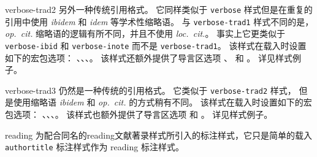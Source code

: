 \begin{marglist}
\item[verbose-trad2]
另外一种传统引用格式。
它同样类似于 \texttt{verbose} 样式但是在重复的引用中使用 \emph{ibidem} 和 \emph{idem} 等学术性缩略语。
与 \texttt{verbose-trad1} 样式不同的是，
\emph{op.~cit.} 缩略语的逻辑有所不同，并且不使用 \emph{loc.~cit.}。
事实上它更类似于 \texttt{verbose-ibid} 和 \texttt{verbose-inote} 而不是 \texttt{verbose-trad1}。
该样式在载入时设置如下的宏包选项：
、、、。
该样式还额外提供了导言区选项 、 和 。
详见样式例子。

\item[verbose-trad3]
仍然是一种传统的引用格式。
它类似于 \texttt{verbose-trad2} 样式，
但是使用缩略语 \emph{ibidem} 和 \emph{op.~cit.} 的方式稍有不同。
该样式在载入时设置如下的宏包选项：
、、、。
该样式也额外提供了导言区选项  和 。
详见样式例子。

\item[reading]
为配合同名的reading文献著录样式所引入的标注样式，它只是简单的载入 \texttt{authortitle} 标注样式作为 reading 标注样式。

\end{marglist}

